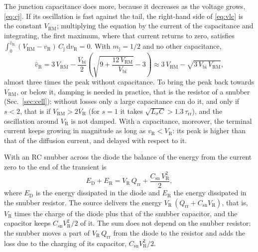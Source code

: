 \documentclass[10pt,a4paper]{scrartcl}
\newcommand{\VR}{V_\mathrm{R}}
\newcommand{\Qrr}{Q_\mathrm{rr}}
\newcommand{\taurr}{\tau_\mathrm{rr}}
\newcommand{\Cj}{C_\mathrm{j}}
\newcommand{\Csn}{C_\mathrm{sn}}
\newcommand{\Vrm}{V_\mathrm{RM}}
\newcommand{\diff}{\mathrm{d}}
\newcommand{\Ls}{L_\sigma}                    %
\newcommand{\Vbi}{V_\mathrm{bi}}
\begin{document}
The junction capacitance does more, because it decreases as the voltage grows, \eqref{eq:cj}. If its oscillation is fast against the tail, the right-hand side of \eqref{eq:vlc} is the constant $\Vrm$; multiplying the equation by the current of the capacitance and integrating, the first maximum, where that current returns to zero, satisfies $\int_0^{\hat v_\mathrm{R}} \mbox{$(\Vrm - v_\mathrm{R})$}\,\Cj\,\diff v_\mathrm{R} = 0$. With $m_\mathrm{j} = 1/2$ and no other capacitance,
\begin{equation}
\hat v_\mathrm{R} = 3\,\Vrm - \frac{\Vbi}{2}\left(\sqrt{9 + \frac{12\,\Vrm}{\Vbi}} - 3\right) \approx 3\,\Vrm - \sqrt{3\,\Vbi\,\Vrm} ,
\label{eq:vpkcj}
\end{equation}
almost three times the peak without capacitance. To bring the peak back towards $\Vrm$, or below it, damping is needed in practice, that is the resistor of a snubber (Sec.~\ref{sec:cell}): without losses only a large capacitance can do it, and only if $s < 2$, that is if $\Vrm > 2\VR$ (for $s = 1$ it takes $\sqrt{\Ls C} > \num{1.3}\,\taurr$), and the oscillation around $\VR$ is not damped. With a capacitance, moreover, the terminal current keeps growing in magnitude as long as $v_\mathrm{R} < \VR$: its peak is higher than that of the diffusion current, and delayed with respect to it.

With an RC snubber across the diode the balance of the energy from the current zero to the end of the transient is
\begin{equation}
E_\mathrm{D} + E_\mathrm{R} = \VR\,\Qrr + \frac{\Csn\,\VR^2}{2} ,
\label{eq:ebal}
\end{equation}
where $E_\mathrm{D}$ is the energy dissipated in the diode and $E_\mathrm{R}$ the energy dissipated in the snubber resistor. The source delivers the energy $\VR\,(\Qrr + \Csn\VR)$, that is, $\VR$ times the charge of the diode plus that of the snubber capacitor, and the capacitor keeps $\Csn\VR^2/2$ of it. The sum does not depend on the snubber resistor: the snubber moves a part of $\VR\,\Qrr$ from the diode to the resistor and adds the loss due to the charging of its capacitor, $\Csn\VR^2/2$.
\end{document}
